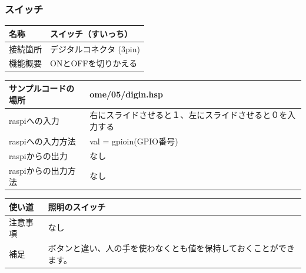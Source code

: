\subsubsection{スイッチ}\label{switch}
\begin{table}[H]
	\begin{tabular}{|p{\colF}|p{\colG}|}	\hline
	名称 & スイッチ（すいっち）\\ \hline
	接続箇所 & デジタルコネクタ (3pin)\\ \hline
	機能概要 & ONとOFFを切りかえる\\ \hline
  \end{tabular}
\end{table}

\begin{table}[H]
	\begin{tabular}{|p{\colF}|p{\colG}|}	\hline
	サンプルコードの場所 & ome/05/digin.hsp\\ \hline
	raspiへの入力 & 右にスライドさせると１、左にスライドさせると０を入力する\\ \hline
	raspiへの入力方法 & val = gpioin(GPIO番号)\\ \hline
	raspiからの出力 & なし\\ \hline
	raspiからの出力方法 & なし\\ \hline
  \end{tabular}
\end{table}

\begin{table}[H]
	\begin{tabular}{|p{\colF}|p{\colG}|} \hline
	使い道 & 照明のスイッチ\\ \hline
	注意事項 & なし\\ \hline
	補足 & ボタンと違い、人の手を使わなくとも値を保持しておくことができます。\\ \hline
  \end{tabular}
\end{table}

